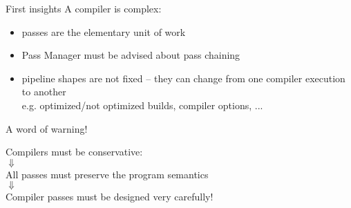 \begin{frame}{First insights}
A compiler is \alert{complex}:

\begin{itemize}
\item passes are the \alert{elementary unit of work}
\item Pass Manager must be \alert{advised} about pass chaining
\item pipeline shapes are \alert{not fixed} -- they can change from one compiler
      execution to another\\
      {\small e.g. optimized/not optimized builds, compiler options, ...}
\end{itemize}
\end{frame}


\begin{frame}{A word of warning!}
\begin{center}
{\large 
Compilers must be \alert{conservative}:\\
\smallskip
$\Downarrow$\\
\smallskip
All passes \alert{must preserve the program semantics}\\
\smallskip
$\Downarrow$\\
\smallskip
Compiler passes must be designed \alert{very carefully}!\\
}
\end{center}
\end{frame}
